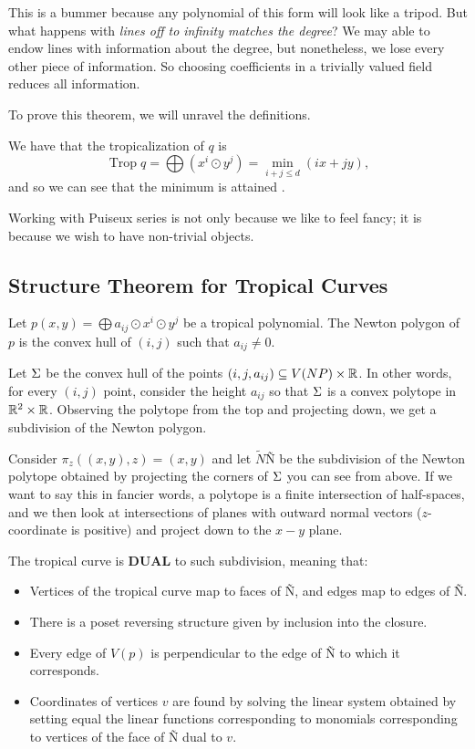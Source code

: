 \documentclass[12pt]{memoir}
\DeclareMathOperator{\Trop}{Trop}
\theoremstyle{definition}
\begin{document}
This is a bummer because any polynomial of this form will look like a tripod. But what happens with \emph{lines off to infinity matches the degree}? We may able to endow lines with information about the degree, but nonetheless, we lose every other piece of information. So choosing coefficients in a trivially valued field reduces all information.\par 
To prove this theorem, we will unravel the definitions.

\begin{ptcbp}
We have that the tropicalization of $q$ is 
$$\Trop q=\bigoplus(x^i\odot y^j)=\min_{i+j\leq d}(ix+jy),$$
and so we can see that the minimum is attained .
\end{ptcbp}

Working with Puiseux series is not only because we like to feel fancy; it is because we wish to have non-trivial objects.

\subsection{Structure Theorem for Tropical Curves}

Let $p(x,y)=\bigoplus a_{ij}\odot x^i\odot y^j$ be a tropical polynomial. The Newton polygon of $p$ is the convex hull of $(i,j)$ such that $a_{ij}\neq 0$.\par 
Let $\Sigma$ be the convex hull of the points $(i,j,a_{ij})\subseteq V(NP)\times\mathbb{R}$. In other words, for every $(i,j)$ point, consider the height $a_{ij}$ so that $\Sigma$ is a convex polytope in $\mathbb{R}^2\times\mathbb{R}$. Observing the polytope from the top and projecting down, we get a subdivision of the Newton polygon.\par 
Consider $\pi_z((x,y),z)=(x,y)$ and let $\tilde{N}$\~N be the subdivision of the Newton polytope obtained by projecting the corners of $\Sigma$ you can see from above.
If we want to say this in fancier words, a polytope is a finite intersection of half-spaces, and we then look at intersections of planes with outward normal vectors ($z$-coordinate is positive) and project down to the $x-y$ plane.\par 
The tropical curve is \textbf{DUAL} to such subdivision, meaning that:
\begin{itemize}
    \item Vertices of the tropical curve map to faces of \~N, and edges map to edges of \~N.
    \item There is a poset reversing structure given by inclusion into the closure.
    \item Every edge of $V(p)$ is perpendicular to the edge of \~N to which it corresponds.
    \item Coordinates of vertices $v$ are found by solving the linear system obtained by setting equal the linear functions corresponding to monomials corresponding to vertices of the face of \~N dual to $v$.
\end{itemize}
\end{document}
